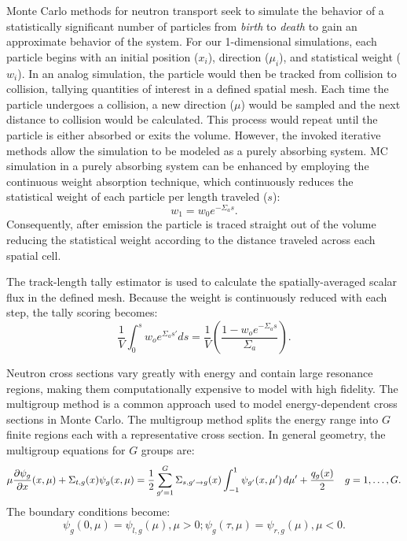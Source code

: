 Monte Carlo methods for neutron transport seek to simulate the behavior of a statistically significant number of particles from \textit{birth} to \textit{death} to gain an approximate behavior of the system. For our 1-dimensional simulations, each particle begins with an initial position ($x_i$), direction ($\mu_i$), and statistical weight ($w_i$). In an analog simulation, the particle would then be tracked from collision to collision, tallying quantities of interest in a defined spatial mesh. Each time the particle undergoes a collision, a new direction ($\mu$) would be sampled and the next distance to collision would be calculated. This process would repeat until the particle is either absorbed or exits the volume. However, the invoked iterative methods allow the simulation to be modeled as a purely absorbing system. MC simulation in a purely absorbing system can be enhanced by employing the continuous weight absorption technique, which continuously reduces the statistical weight of each particle per length traveled ($s$):
\begin{equation}
    \label{equation:7}
    w_{1} = w_{0}e^{-\Sigma_{a}s}.
\end{equation}
Consequently, after emission the particle is traced straight out of the volume reducing the statistical weight according to the distance traveled across each spatial cell.

The track-length tally estimator is used to calculate the spatially-averaged scalar flux in the defined mesh. Because the weight is continuously reduced with each step, the tally scoring becomes:
\begin{equation}
    \label{equation:8}
    \frac{1}{V}\int_{0}^{s}w_{o}e^{\Sigma_{a}s\prime}ds = \frac{1}{V}\left(\frac{1-w_{o}e^{-\Sigma_{a}s}}{\Sigma_{a}}\right).
\end{equation}

Neutron cross sections vary greatly with energy and contain large resonance regions, making them computationally expensive to model with high fidelity. The multigroup method is a common approach used to model energy-dependent cross sections in Monte Carlo. The multigroup method splits the energy range into $G$ finite regions each with a representative cross section. In general geometry, the multigroup equations for $G$ groups are:
\begin{equation}\label{eq:MG}
\mu  \frac{\partial \psi_g}{\partial x} (x,\mu) + \Sigma_{t,g}(x) \psi_g(x,\mu) =
\frac{1}{2} \sum_{g'=1}^G \Sigma_{s,g'\rightarrow g}(x) \int_{-1}^1 \psi_{g'}(x, \mu') \, d\mu' + \frac{q_g(x)}{2} \quad g=1,\dots,G.
\end{equation}The boundary conditions become:
\[
\psi_g(0, \mu) = \psi_{l,g}(\mu), \mu > 0; \psi_g(\tau, \mu) = \psi_{r,g}(\mu),
\mu < 0.
\]

